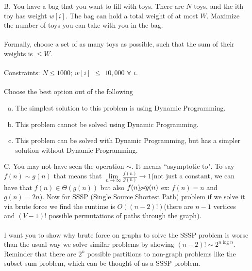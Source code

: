 \documentclass[12pt]{article}
\begin{document}
B. You have a bag that you want to fill with toys. 
There are $N$ toys, and the ith toy has weight $w[i]$. The bag 
can hold a total weight of at most $W$. Maximize the number 
of toys you can take with you in the bag.\\\\
Formally, choose a set of as many toys as possible, 
such that the sum of their weights is $\leq W$.\\\\
Constraints: $N \leq 1000$; $w[i]$ $\leq$ $10,000$ $\forall$ $i$.\\\\
Choose the best option out of the following
\begin{enumerate}[a)]
    \item The simplest solution to this problem is using Dynamic Programming.
    \item This problem cannot be solved using Dynamic Programming.
    \item This problem can be solved with Dynamic Programming, but has a simpler solution without Dynamic Programming.
\end{enumerate}
\newpage
\noindent C. You may not have seen the operation $\sim$. 
It means ``asymptotic to". To say $f(n) \sim g(n)$ that means that 
$\lim\limits_{n\to\infty}\frac{f(n)}{g(n)} \to 1$(not just a constant, we can have that $f(n) \in \Theta (g(n))$
but also $f(n) \cancel{\sim} g(n)$ ex: $f(n) = n$ and $g(n) = 2n$). Now for SSSP (Single Source Shortest Path) problem
if we solve it via brute force we find the runtime is $O((n-2)!)$(there are $n-1$ 
vertices and $(V-1)!$ possible permutations of paths through the graph).\\\\
I want you to show why brute force on graphs to solve the SSSP problem is worse than
the usual way we solve similar problems by showing $(n-2)! \sim 2^{n\log{n}}$. 
Reminder that there are $2^{n}$ possible partitions to non-graph problems 
like the subset sum problem, which can be thought of as a SSSP problem.
\newpage
\end{document}
